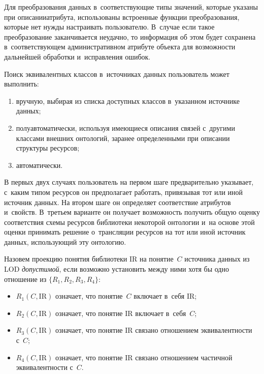 \begin{multicols}{2}
    Для преобразования данных в~соответствующие типы значений, которые 
указаны при описании\linebreak атрибута, использованы встроенные функции 
пре\-об\-ра\-зо\-ва\-ния, которые нет нужды настраивать пользователю. В~случае 
если такое преобразование заканчивается неудачно, то информация об этом\linebreak 
будет сохранена в~соответствующем административном атрибуте объекта для 
возможности дальнейшей обработки и~исправления ошибок.
    
    Поиск эквивалентных классов в~источниках данных пользователь может 
выполнить: 
    \begin{enumerate}[(1)]
\item вручную, выбирая из списка доступных классов в~указанном 
источнике данных;
\item полуавтоматически, используя имеющиеся описания связей 
с~другими классами внешних онтологий, заранее определенными при 
описании структуры ресурсов;
\item автоматически. 
\end{enumerate}

    В первых двух случаях пользователь на первом шаге предварительно 
указывает, с~каким типом ресурсов он предполагает работать, привязывая тот 
или иной источник данных. На втором шаге он определяет соответствие 
атрибутов и~свойств. В~треть\-ем варианте он получает возможность получить 
общую оценку соответствия схемы ресурсов библиотеки некоторой 
онтологии и~на основе этой оценки принимать решение о~трансляции 
ресурсов на тот или иной источник данных, использующий эту онтологию.
    
    Назовем проекцию понятия библиотеки $\mathrm{IR}$ на понятие~$C$ источника 
данных из LOD \textit{допустимой}, если возможно установить между ними 
хотя бы одно отношение из $\{R_1, R_2, R_3, R_4\}$: 
    \begin{itemize}
\item $R_1(C, \mathrm{IR})$ означает, что понятие~$C$ включает в~себя $\mathrm{IR}$;
\item $R_2(C, \mathrm{IR})$ означает, что понятие $\mathrm{IR}$ включает в~себя~$C$;
\item $R_3(C, \mathrm{IR})$ означает, что понятие $\mathrm{IR}$ связано отношением 
эквивалентности с~$C$;
\item $R_4(C, \mathrm{IR})$ означает, что понятие $\mathrm{IR}$ связано отношением 
частичной эквивалентности с~$C$.
\end{itemize}


\end{multicols}
